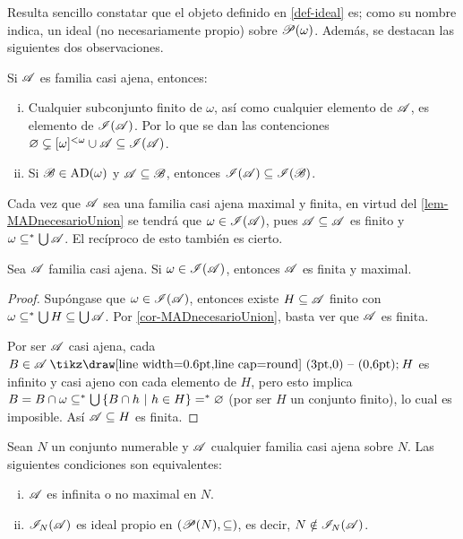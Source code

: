  Resulta sencillo constatar que el objeto definido en \ref{def-ideal} es; como su nombre indica, un ideal (no necesariamente propio) sobre $\mathscr{P}(\omega)$. Además, se destacan las siguientes dos observaciones.

 \begin{observacion}\label{obs-IdealPrevia}
  Si $\mathscr{A}$ es familia casi ajena, entonces:
  \begin{enumerate}[i)]
   \item Cualquier subconjunto finito de $\omega$, así como cualquier elemento de $\mathscr{A}$, es elemento de $\mathscr{I}(\mathscr{A})$. Por lo que se dan las contenciones $\varnothing \subsetneq [\omega]^{<\omega} \cup \mathscr{A} \subseteq \mathscr{I}(\mathscr{A})$.
   \item Si $\mathscr{B} \in \operatorname{AD}(\omega)$ y $\mathscr{A} \subseteq \mathscr{B}$, entonces $\mathscr{I}(\mathscr{A}) \subseteq \mathscr{I}(\mathscr{B})$.
  \end{enumerate}
 \end{observacion}

 Cada vez que $\mathscr{A}$ sea una familia casi ajena maximal y finita, en virtud del \autoref{lem-MADnecesarioUnion} se tendrá que $\omega \in \mathscr{I}(\mathscr{A})$, pues $\mathscr{A} \subseteq \mathscr{A}$ es finito y $\omega \subseteq^* \mbox{$\bigcup$}\, \mathscr{A}$. El recíproco de esto también es cierto.

 \begin{proposicion}
  Sea $\mathscr{A}$ familia casi ajena. Si $\omega \in \mathscr{I}(\mathscr{A})$, entonces $\mathscr{A}$ es finita y maximal.
 \end{proposicion}

 \begin{proof}
  Supóngase que $\omega \in \mathscr{I}(\mathscr{A})$, entonces existe $H \subseteq \mathscr{A}$ finito con $\omega \subseteq^* \mbox{$\bigcup$}\, H \subseteq \mbox{$\bigcup$}\, \mathscr{A}$. Por \ref{cor-MADnecesarioUnion}, basta ver que $\mathscr{A}$ es finita.

  Por ser $\mathscr{A}$ casi ajena, cada $B \in \ms{A} \setminus H$ es infinito y casi ajeno con cada elemento de $H$, pero esto implica $ B = B \cap \omega \subseteq^* \mbox{$\bigcup$}\, \{B \cap h \text{ $|$ } h \in H \} =^* \varnothing $ (por ser $H$ un conjunto finito), lo cual es imposible. Así $\mathscr{A} \subseteq H$ es finita.
 \end{proof}

 \begin{corolario}\label{cor-IdealPropioCaract}
  Sean $N$ un conjunto numerable y $\mathscr{A}$ cualquier familia casi ajena sobre $N$. Las siguientes condiciones son equivalentes:
  \begin{enumerate}[i)]
   \item $\mathscr{A}$ es infinita o no maximal en $N$.
   \item $\mathscr{I}_N(\mathscr{A})$ es ideal propio en $(\mathscr{P}(N),\subseteq)$, es decir, $N \notin \mathscr{I}_N(\mathscr{A})$.
  \end{enumerate}
 \end{corolario}


